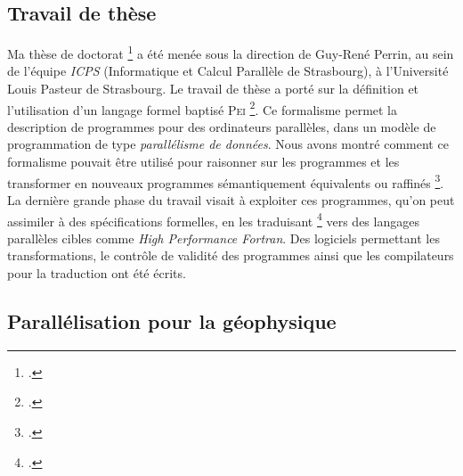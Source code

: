 \documentclass[11pt]{article}
\begin{document}
\subsection{Travail de thèse}
Ma th\`{e}se de doctorat \footcite{icps-1997-4} a été menée sous la direction de Guy-René Perrin, au sein de 
l'équipe {\em ICPS} (Informatique et Calcul Parallèle de Strasbourg), à l'Université Louis Pasteur de Strasbourg.
Le travail de thèse a porté sur la définition et l'utilisation d'un langage formel baptisé \textsc{Pei} \footcite{Violard92b}. 
Ce formalisme permet la description de programmes pour des ordinateurs parall\`{e}les, dans un modèle de programmation de type \emph{parallélisme de données}. 
Nous avons montré comment ce formalisme pouvait être utilisé pour raisonner sur les programmes et les transformer en nouveaux programmes sémantiquement équivalents ou raffinés \footcite{icps-1994-46,icps-1995-1,icps-1997-3,icps-1996-2}.
La dernière grande phase du travail visait à exploiter ces programmes, qu'on peut assimiler à des spécifications formelles, en les traduisant \footcite{icps-1998-5} vers des langages parall\`{e}les cibles comme \textit{High Performance Fortran}.
Des logiciels permettant les transformations, le contrôle de validité des programmes ainsi que les compilateurs pour la traduction ont été écrits.\\


\subsection{Parallélisation pour la géophysique}
\end{document}
